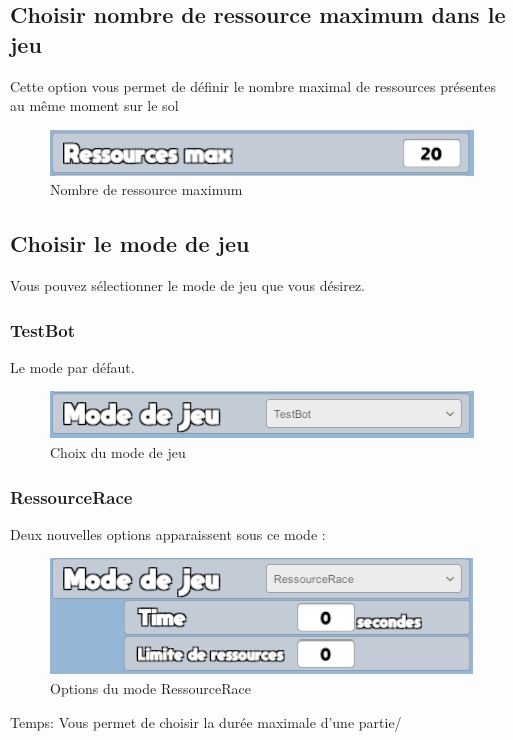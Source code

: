 \documentclass{report}
\begin{document}
\subsection{Choisir nombre de ressource maximum dans le jeu}
Cette option vous permet de définir le nombre maximal de ressources présentes au même moment sur le sol
\begin{figure}[!h]
	\centering
		\includegraphics[scale=0.80]{Limite_Ressources}
	\caption{Nombre de ressource maximum}
\end{figure}


\subsection{Choisir le mode de jeu}
Vous pouvez sélectionner le mode de jeu que vous désirez.
\subsubsection{TestBot}
Le mode par défaut.
\begin{figure}[!h]
	\centering
		\includegraphics[scale=0.80]{ModeJeuTestBot}
	\caption{Choix du mode de jeu}
\end{figure}


\subsubsection{RessourceRace}
Deux nouvelles options apparaissent sous ce mode :
\begin{figure}[!h]
	\centering
		\includegraphics[scale=0.80]{ModeJeuRessourceRace}
	\caption{Options du mode RessourceRace}
\end{figure}

Temps: \newline
Vous permet de choisir la durée maximale d’une partie/\newline
\end{document}
